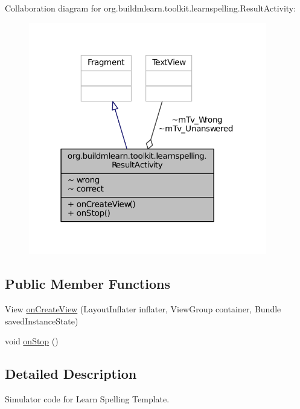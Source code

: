 Collaboration diagram for org.\-buildmlearn.\-toolkit.\-learnspelling.\-Result\-Activity\-:
\nopagebreak
\begin{figure}[H]
\begin{center}
\leavevmode
\includegraphics[width=295pt]{d6/d52/classorg_1_1buildmlearn_1_1toolkit_1_1learnspelling_1_1ResultActivity__coll__graph}
\end{center}
\end{figure}
\subsection*{Public Member Functions}
\begin{DoxyCompactItemize}
\item 
View \hyperlink{classorg_1_1buildmlearn_1_1toolkit_1_1learnspelling_1_1ResultActivity_a3a2dfc9b13e184b57e2003c6c2c05131}{on\-Create\-View} (Layout\-Inflater inflater, View\-Group container, Bundle saved\-Instance\-State)
\item 
void \hyperlink{classorg_1_1buildmlearn_1_1toolkit_1_1learnspelling_1_1ResultActivity_a602c95278014ebcb073528f459507ad8}{on\-Stop} ()
\end{DoxyCompactItemize}


\subsection{Detailed Description}
Simulator code for Learn Spelling Template. 

